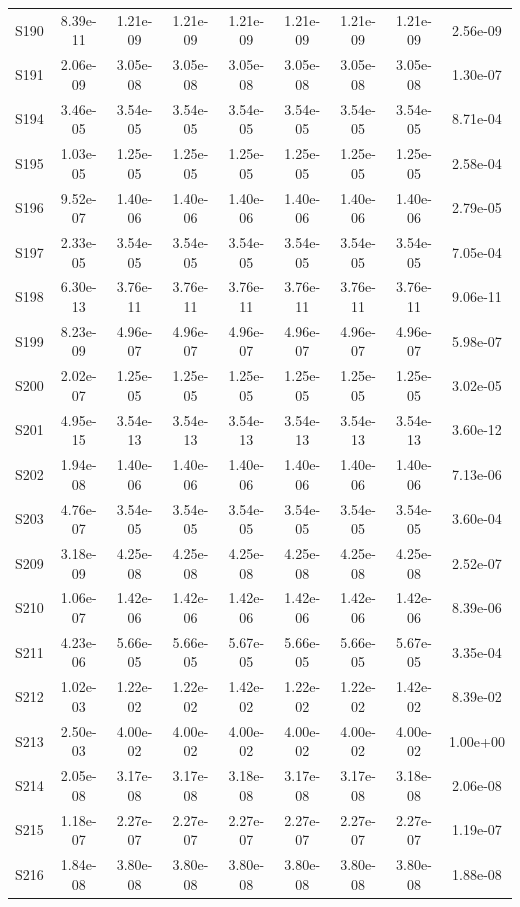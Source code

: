 {\begin{longtable}{l S[table-format=1.2e+2] S[table-format=1.2e+2] S[table-format=1.2e+2] S[table-format=1.2e+2] S[table-format=1.2e+2] S[table-format=1.2e+2] S[table-format=1.2e+2] S[table-format=1.2e+2]}
S190 & 8.39e-11 & 1.21e-09 & 1.21e-09 & 1.21e-09 & 1.21e-09 & 1.21e-09 & 1.21e-09 & 2.56e-09 \\
S191 & 2.06e-09 & 3.05e-08 & 3.05e-08 & 3.05e-08 & 3.05e-08 & 3.05e-08 & 3.05e-08 & 1.30e-07 \\
S194 & 3.46e-05 & 3.54e-05 & 3.54e-05 & 3.54e-05 & 3.54e-05 & 3.54e-05 & 3.54e-05 & 8.71e-04 \\
S195 & 1.03e-05 & 1.25e-05 & 1.25e-05 & 1.25e-05 & 1.25e-05 & 1.25e-05 & 1.25e-05 & 2.58e-04 \\
S196 & 9.52e-07 & 1.40e-06 & 1.40e-06 & 1.40e-06 & 1.40e-06 & 1.40e-06 & 1.40e-06 & 2.79e-05 \\
S197 & 2.33e-05 & 3.54e-05 & 3.54e-05 & 3.54e-05 & 3.54e-05 & 3.54e-05 & 3.54e-05 & 7.05e-04 \\
S198 & 6.30e-13 & 3.76e-11 & 3.76e-11 & 3.76e-11 & 3.76e-11 & 3.76e-11 & 3.76e-11 & 9.06e-11 \\
S199 & 8.23e-09 & 4.96e-07 & 4.96e-07 & 4.96e-07 & 4.96e-07 & 4.96e-07 & 4.96e-07 & 5.98e-07 \\
S200 & 2.02e-07 & 1.25e-05 & 1.25e-05 & 1.25e-05 & 1.25e-05 & 1.25e-05 & 1.25e-05 & 3.02e-05 \\
S201 & 4.95e-15 & 3.54e-13 & 3.54e-13 & 3.54e-13 & 3.54e-13 & 3.54e-13 & 3.54e-13 & 3.60e-12 \\
S202 & 1.94e-08 & 1.40e-06 & 1.40e-06 & 1.40e-06 & 1.40e-06 & 1.40e-06 & 1.40e-06 & 7.13e-06 \\
S203 & 4.76e-07 & 3.54e-05 & 3.54e-05 & 3.54e-05 & 3.54e-05 & 3.54e-05 & 3.54e-05 & 3.60e-04 \\
S209 & 3.18e-09 & 4.25e-08 & 4.25e-08 & 4.25e-08 & 4.25e-08 & 4.25e-08 & 4.25e-08 & 2.52e-07 \\
S210 & 1.06e-07 & 1.42e-06 & 1.42e-06 & 1.42e-06 & 1.42e-06 & 1.42e-06 & 1.42e-06 & 8.39e-06 \\
S211 & 4.23e-06 & 5.66e-05 & 5.66e-05 & 5.67e-05 & 5.66e-05 & 5.66e-05 & 5.67e-05 & 3.35e-04 \\
S212 & 1.02e-03 & 1.22e-02 & 1.22e-02 & 1.42e-02 & 1.22e-02 & 1.22e-02 & 1.42e-02 & 8.39e-02 \\
S213 & 2.50e-03 & 4.00e-02 & 4.00e-02 & 4.00e-02 & 4.00e-02 & 4.00e-02 & 4.00e-02 & 1.00e+00 \\
S214 & 2.05e-08 & 3.17e-08 & 3.17e-08 & 3.18e-08 & 3.17e-08 & 3.17e-08 & 3.18e-08 & 2.06e-08 \\
S215 & 1.18e-07 & 2.27e-07 & 2.27e-07 & 2.27e-07 & 2.27e-07 & 2.27e-07 & 2.27e-07 & 1.19e-07 \\
S216 & 1.84e-08 & 3.80e-08 & 3.80e-08 & 3.80e-08 & 3.80e-08 & 3.80e-08 & 3.80e-08 & 1.88e-08 \\

\end{longtable}}
